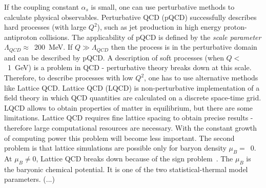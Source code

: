       If the coupling constant $\alpha_s$ is small, one can use perturbative methods to calculate physical observables.
      Perturbative QCD (pQCD) successfully describes hard processes (with large $Q^2$), such as jet production in high energy proton-antiproton collisions.
      The applicability of pQCD is defined by the \textit{scale parameter} $\Lambda_{QCD} \approx$~200~MeV.
      If $Q \gg \Lambda_{QCD}$ then the process is in the perturbative domain and can be described by pQCD.
      A description of soft processes (when $Q <$~1~GeV) is a problem in QCD - perturbative theory breaks down at this scale.
      Therefore, to describe processes with low $Q^2$, one has to use alternative methods like Lattice QCD.
      Lattice QCD (LQCD) is non-perturbative implementation of a field theory in which QCD quantities are calculated on a discrete space-time grid.
      LQCD allows to obtain properties of matter in equilibrium, but there are some limitations.
      Lattice QCD requires fine lattice spacing to obtain precise results - therefore large computational resources are necessary.
      With the constant growth of computing power this problem will become less important.
      The second problem is that lattice simulations are possible only for baryon density $\mu_B = $~0.
      At $\mu_B \neq 0$, Lattice QCD breaks down because of the sign problem~\cite{qcd_fodor}.
      The $\mu_B$ is the baryonic chemical potential.
      It is one of the two statistical-thermal model parameters. (...)
      
